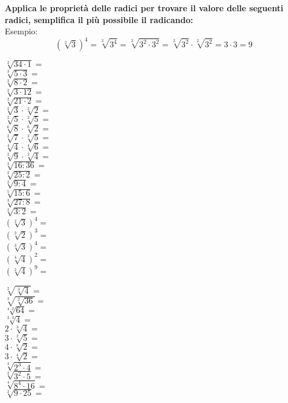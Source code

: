 \documentclass[14pt]{extarticle}
\begin{document}
\clearpage

\begin{spacing}{1.5}
\textbf{Applica le proprietà delle radici per trovare il valore delle seguenti radici, semplifica il più possibile il radicando:}\\
Esempio:\[(\sqrt[2]{3})^4=\sqrt[2]{3^4}=\sqrt[2]{3^2\cdot3^2}=\sqrt[2]{3^2}\cdot\sqrt[2]{3^2}=3\cdot3=9\]
\begin{minipage}[t]{0.5\textwidth}
\(\sqrt[2]{34\cdot 1}=\)\\
\(\sqrt[3]{5\cdot 3}=\)\\
\(\sqrt[2]{8\cdot 2}=\)\\
\(\sqrt[2]{3\cdot 12}=\)\\
\(\sqrt[2]{21\cdot 2}=\)\\
\(\sqrt[2]{3}\cdot\sqrt[2]{2}=\)\\
\(\sqrt[2]{5}\cdot\sqrt[2]{5}=\)\\
\(\sqrt[6]{8}\cdot\sqrt[6]{2}=\)\\
\(\sqrt[2]{7}\cdot\sqrt[2]{5}=\)\\
\(\sqrt[4]{4}\cdot\sqrt[4]{6}=\)\\
\(\sqrt[2]{9}\cdot\sqrt[2]{4}=\)\\
\(\sqrt[2]{16:36}=\)\\
\(\sqrt[2]{25:2}=\)\\
\(\sqrt[2]{9:4}=\)\\
\(\sqrt[5]{15:6}=\)\\
\(\sqrt[3]{27: 8}=\)\\
\(\sqrt[2]{3: 2}=\)\\
\((\sqrt[2]{3})^4=\)\\
\((\sqrt[2]{2})^3=\)\\
\((\sqrt[3]{3})^4=\)\\
\((\sqrt[4]{4})^2=\)\\
\((\sqrt[2]{4})^9=\)
\end{minipage}
\begin{minipage}[t]{0.5\textwidth}
\(\sqrt[2]{\sqrt[3]{4}}=\)\\
\(\sqrt[3]{\sqrt[2]{36}}=\)\\
\(\sqrt[4\cdot 2]{64}=\)\\
\(\sqrt[2\cdot 3]{4}=\)\\
\(2\cdot\sqrt[3]{4}=\)\\
\(3\cdot\sqrt[2]{5}=\)\\
\(4\cdot\sqrt[8]{2}=\)\\
\(3\cdot\sqrt[4]{2}=\)\\
\(\sqrt[3]{2^3\cdot 4}=\) \\
\(\sqrt[2]{3^2\cdot 5}=\) \\
\(\sqrt[4]{8^4\cdot 16}=\) \\
\(\sqrt[2]{9\cdot 25}=\) \\
\end{minipage}
\end{spacing}
\end{document}
